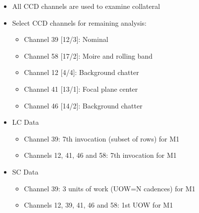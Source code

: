 \begin{itemize}

\item All CCD channels are used to examine collateral
\item Select CCD channels for remaining analysis:

  \begin{itemize}
    \item Channel 39 [12/3]: Nominal
    \item Channel 58 [17/2]: Moire and rolling band
    \item Channel 12 [4/4]: Background chatter
    \item Channel 41 [13/1]: Focal plane center
    \item Channel 46 [14/2]: Background chatter
  \end{itemize}

\item LC Data

  \begin{itemize}
    \item Channel 39: 7th invocation (subset of rows) for M1
    \item Channels 12, 41, 46 and 58: 7th invocation for M1 
  \end{itemize}

\item SC Data

  \begin{itemize}
    \item Channel 39: 3 units of work (UOW=N cadences) for M1
    \item Channels 12, 39, 41, 46 and 58: 1st UOW for M1
  \end{itemize}

\end{itemize}
